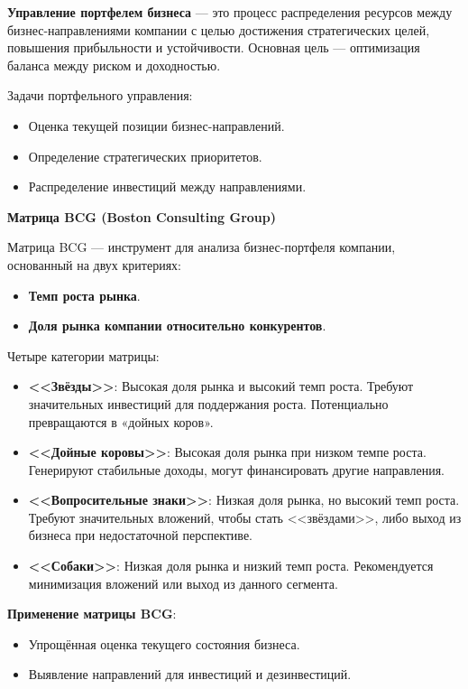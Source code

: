 \textbf{Управление портфелем бизнеса} --- это процесс распределения ресурсов между бизнес-направлениями компании с целью достижения стратегических целей, повышения прибыльности и устойчивости. Основная цель --- оптимизация баланса между риском и доходностью.

Задачи портфельного управления:
\begin{itemize}
    \item Оценка текущей позиции бизнес-направлений.
    \item Определение стратегических приоритетов.
    \item Распределение инвестиций между направлениями.
\end{itemize}

\textbf{Матрица BCG (Boston Consulting Group)}

Матрица BCG --- инструмент для анализа бизнес-портфеля компании, основанный на двух критериях:
\begin{itemize}
    \item \textbf{Темп роста рынка}.
    \item \textbf{Доля рынка компании относительно конкурентов}.
\end{itemize}

Четыре категории матрицы:
\begin{itemize}
    \item \textbf{<<Звёзды>>}: Высокая доля рынка и высокий темп роста. Требуют значительных инвестиций для поддержания роста. Потенциально превращаются в «дойных коров».
    \item \textbf{<<Дойные коровы>>}: Высокая доля рынка при низком темпе роста. Генерируют стабильные доходы, могут финансировать другие направления.
    \item \textbf{<<Вопросительные знаки>>}: Низкая доля рынка, но высокий темп роста. Требуют значительных вложений, чтобы стать <<звёздами>>, либо выход из бизнеса при недостаточной перспективе.
    \item \textbf{<<Собаки>>}: Низкая доля рынка и низкий темп роста. Рекомендуется минимизация вложений или выход из данного сегмента.
\end{itemize}

\textbf{Применение матрицы BCG}:
\begin{itemize}
    \item Упрощённая оценка текущего состояния бизнеса.
    \item Выявление направлений для инвестиций и дезинвестиций.
\end{itemize}


